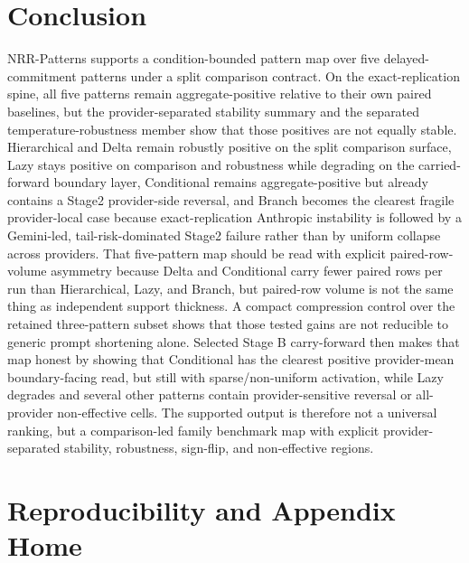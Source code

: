 \documentclass[11pt,a4paper]{article}
\begin{document}
\section{Conclusion}
\label{sec:conclusion}

NRR-Patterns supports a condition-bounded pattern map over five delayed-commitment patterns under a split comparison contract. On the exact-replication spine, all five patterns remain aggregate-positive relative to their own paired baselines, but the provider-separated stability summary and the separated temperature-robustness member show that those positives are not equally stable. Hierarchical and Delta remain robustly positive on the split comparison surface, Lazy stays positive on comparison and robustness while degrading on the carried-forward boundary layer, Conditional remains aggregate-positive but already contains a Stage2 provider-side reversal, and Branch becomes the clearest fragile provider-local case because exact-replication Anthropic instability is followed by a Gemini-led, tail-risk-dominated Stage2 failure rather than by uniform collapse across providers. That five-pattern map should be read with explicit paired-row-volume asymmetry because Delta and Conditional carry fewer paired rows per run than Hierarchical, Lazy, and Branch, but paired-row volume is not the same thing as independent support thickness. A compact compression control over the retained three-pattern subset shows that those tested gains are not reducible to generic prompt shortening alone. Selected Stage B carry-forward then makes that map honest by showing that Conditional has the clearest positive provider-mean boundary-facing read, but still with sparse/non-uniform activation, while Lazy degrades and several other patterns contain provider-sensitive reversal or all-provider non-effective cells. The supported output is therefore not a universal ranking, but a comparison-led family benchmark map with explicit provider-separated stability, robustness, sign-flip, and non-effective regions.

\section{Reproducibility and Appendix Home}
\label{sec:repro}
\end{document}
